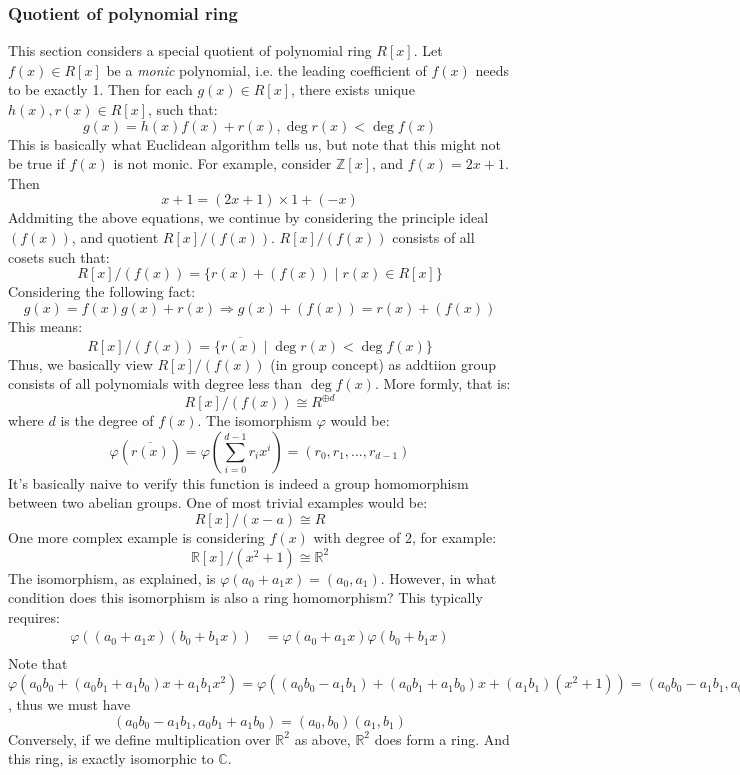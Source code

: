 \documentclass[a4paper, pdf, 11.5pt]{article}
\begin{document}
\subsubsection{Quotient of polynomial ring}
This section considers a special quotient of polynomial ring $R[x]$. Let $f(x)\in R[x]$ be a 
\textit{monic} polynomial, i.e. the leading coefficient of $f(x)$ needs to be exactly 1. Then 
for each $g(x)\in R[x]$, there exists unique $h(x), r(x)\in R[x]$, such that:
$$
g(x) = h(x)f(x) + r(x), \deg r(x) < \deg f(x)
$$
This is basically what Euclidean algorithm tells us, but note that this might not 
be true if $f(x)$ is not monic. For example, consider $\mathbb{Z}[x]$, and $f(x) = 2x+1$. Then 
$$
x+1 = (2x+1) \times 1 + (-x)
$$
Addmiting the above equations, we continue by considering the principle ideal $(f(x))$, and quotient
$R[x]/(f(x))$. $R[x]/(f(x))$ consists of all cosets such that:
$$
R[x]/(f(x)) = \{r(x) + (f(x))\mid r(x)\in R[x]\}
$$
Considering the following fact: 
$$
g(x) = f(x)g(x) + r(x) \Rightarrow g(x) + (f(x)) = r(x) + (f(x))
$$
This means:
$$
R[x]/(f(x)) = \{\overline{r(x)}\mid \deg r(x) < \deg f(x)\}
$$
Thus, we basically view $R[x]/(f(x))$ (in group concept) as addtiion group 
consists of all polynomials with degree less than $\deg f(x)$. More formly, 
that is:
$$
R[x]/(f(x))\cong R^{\oplus d}
$$
where $d$ is the degree of $f(x)$. The isomorphism $\varphi$ would be:
$$
\varphi(\overline{r(x)}) = \varphi(\sum_{i=0}^{d-1}r_{i}x^{i})=(r_0, r_1,\ldots, r_{d-1})
$$
It's basically naive to verify this function is indeed a group homomorphism between two abelian groups. 
One of most trivial examples would be:
$$
R[x]/(x - a)\cong R
$$
One more complex example is considering $f(x)$ with degree of 2, for example:
$$
\mathbb{R}[x]/(x^{2} + 1) \cong \mathbb{R}^{2}
$$
The isomorphism, as explained, is $\varphi(a_0 + a_1x) = (a_0, a_1)$. However, in what 
condition does this isomorphism is also a ring homomorphism? This typically requires:
$$
\begin{aligned}
\varphi((a_0+a_1x)(b_0+b_1x)) &= \varphi(a_0+a_1x)\varphi(b_0+b_1x)\\
\end{aligned}
$$
Note that 
$
\varphi(a_0b_0 + (a_0b_1 + a_1b_0)x + a_1b_1x^{2}) = 
\varphi((a_0b_0-a_1b_1)+(a_0b_1+a_1b_0)x+(a_1b_1)(x^2+1)) = (a_0b_0-a_1b_1, a_0b_1+a_1b_0)
$, thus we must have 
$$
(a_0b_0-a_1b_1, a_0b_1+a_1b_0) = (a_0, b_0)(a_1, b_1)
$$
Conversely, if we define multiplication over $\mathbb{R}^{2}$ as above, $\mathbb{R}^{2}$ does 
form a ring. And this ring, is exactly isomorphic to $\mathbb{C}$.
\end{document}
